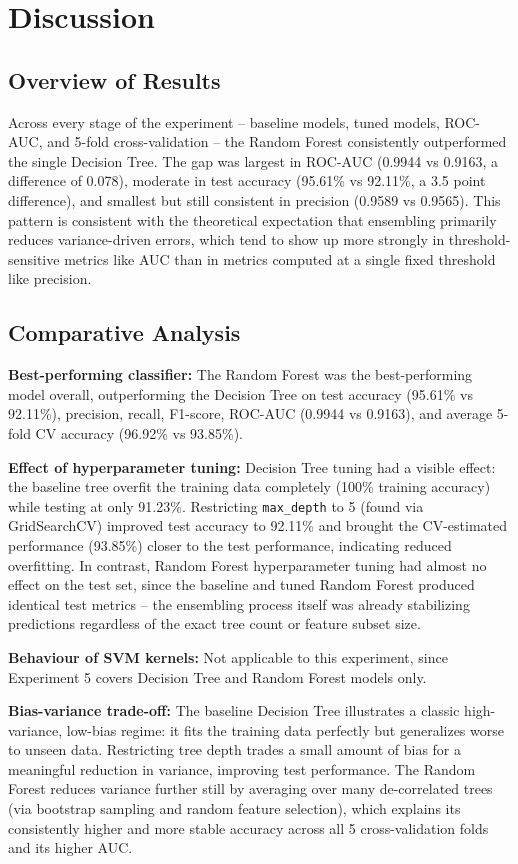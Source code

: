 \documentclass[12pt,a4paper]{article}
\begin{document}
\section{Discussion}

\subsection{Overview of Results}
Across every stage of the experiment -- baseline models, tuned models, ROC-AUC, and 5-fold cross-validation -- the Random Forest consistently outperformed the single Decision Tree. The gap was largest in ROC-AUC (0.9944 vs 0.9163, a difference of 0.078), moderate in test accuracy (95.61\% vs 92.11\%, a 3.5 point difference), and smallest but still consistent in precision (0.9589 vs 0.9565). This pattern is consistent with the theoretical expectation that ensembling primarily reduces variance-driven errors, which tend to show up more strongly in threshold-sensitive metrics like AUC than in metrics computed at a single fixed threshold like precision.

\subsection{Comparative Analysis}
\textbf{Best-performing classifier:} The Random Forest was the best-performing model overall, outperforming the Decision Tree on test accuracy (95.61\% vs 92.11\%), precision, recall, F1-score, ROC-AUC (0.9944 vs 0.9163), and average 5-fold CV accuracy (96.92\% vs 93.85\%).

\textbf{Effect of hyperparameter tuning:} Decision Tree tuning had a visible effect: the baseline tree overfit the training data completely (100\% training accuracy) while testing at only 91.23\%. Restricting \texttt{max\_depth} to 5 (found via GridSearchCV) improved test accuracy to 92.11\% and brought the CV-estimated performance (93.85\%) closer to the test performance, indicating reduced overfitting. In contrast, Random Forest hyperparameter tuning had almost no effect on the test set, since the baseline and tuned Random Forest produced identical test metrics -- the ensembling process itself was already stabilizing predictions regardless of the exact tree count or feature subset size.

\textbf{Behaviour of SVM kernels:} Not applicable to this experiment, since Experiment 5 covers Decision Tree and Random Forest models only.

\textbf{Bias-variance trade-off:} The baseline Decision Tree illustrates a classic high-variance, low-bias regime: it fits the training data perfectly but generalizes worse to unseen data. Restricting tree depth trades a small amount of bias for a meaningful reduction in variance, improving test performance. The Random Forest reduces variance further still by averaging over many de-correlated trees (via bootstrap sampling and random feature selection), which explains its consistently higher and more stable accuracy across all 5 cross-validation folds and its higher AUC.
\end{document}
